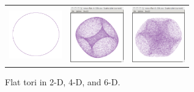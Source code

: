 \begin{figure}[ht]
  \centering
    \begin{tabular}{c c c}
      \includegraphics[width=0.9in]{fig/torus-flat-2.pdf} &
      \includegraphics[width=0.9in]{fig/torus-flat-4.pdf} &
      \includegraphics[width=0.9in]{fig/torus-flat-6.pdf}
    \end{tabular}
  \caption{Flat tori in 2-D, 4-D, and 6-D.}
  \label{flat1}
\end{figure}

